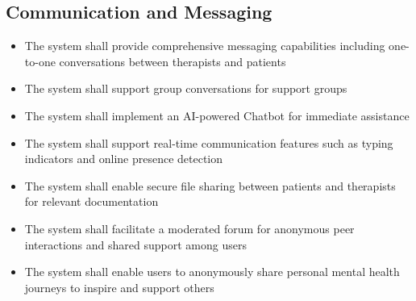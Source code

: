 \subsection{Communication and Messaging}
\begin{itemize}
    \item The system shall provide comprehensive messaging capabilities including one-to-one conversations between therapists and patients
    \item The system shall support group conversations for support groups
    \item The system shall implement an AI-powered Chatbot for immediate assistance
    \item The system shall support real-time communication features such as typing indicators and online presence detection
    \item The system shall enable secure file sharing between patients and therapists for relevant documentation
    \item The system shall facilitate a moderated forum for anonymous peer interactions and shared support among users
    \item The system shall enable users to anonymously share personal mental health journeys to inspire and support others
\end{itemize}

